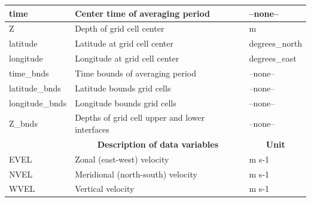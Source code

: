 \begin{longtable}{|m{}|m{}|m{}|}
time &Center time of averaging period &--none--  \\ \hline
Z &Depth of grid cell center &m  \\ \hline
latitude &Latitude at grid cell center &degrees\_north  \\ \hline
longitude &Longitude at grid cell center &degrees\_east  \\ \hline
time\_bnds &Time bounds of averaging period &--none--  \\ \hline
latitude\_bnds &Latitude bounds grid cells &--none--  \\ \hline
longitude\_bnds &Longitude bounds grid cells &--none--  \\ \hline
Z\_bnds &Depths of grid cell upper and lower interfaces &--none--  \\ \hline
\rowcolor{lightgray} \multicolumn{1}{|c|}{\textbf{Variables}} & \multicolumn{1}{|c|}{\textbf{Description of data variables}} &  \multicolumn{1}{|c|}{\textbf{Unit}}\\ \hline
EVEL &Zonal (east-west) velocity &m s-1  \\ \hline
NVEL &Meridional (north-south) velocity &m s-1  \\ \hline
WVEL &Vertical velocity &m s-1  \\ \hline
\end{longtable}

\newp
\pagebreak
